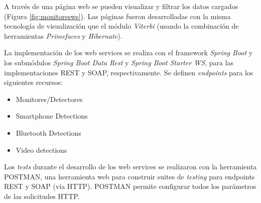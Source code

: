 A través de una página web se pueden visualizar y filtrar los datos cargados (Figura \ref{fig:monitoresws}). Las páginas fueron desarrolladas con la misma tecnología de visualización que el módulo \textit{Viterbi} (usando la combinación de herramientas \textit{Primefaces} y \textit{Hibernate}).

La implementación de los web services se realiza con el framework \textit{Spring Boot} y los submódulos \textit{Spring Boot Data Rest} y \textit{Spring Boot Starter WS}, para las implementaciones REST y SOAP, respectivamente. Se definen \textit{endpoints} para los siguientes recursos:

\begin{itemize}
\item Monitores/Detectores
\item Smartphone Detections
\item Bluetooth Detections
\item Video detections
\end{itemize}

Los \textit{tests} durante el desarrollo de los web services se realizaron con la herramienta POSTMAN, una herramienta web para construir suites de \textit{testing} para endpoints REST y SOAP (vía HTTP). POSTMAN permite configurar todos los parámetros de las solicitudes HTTP. 

